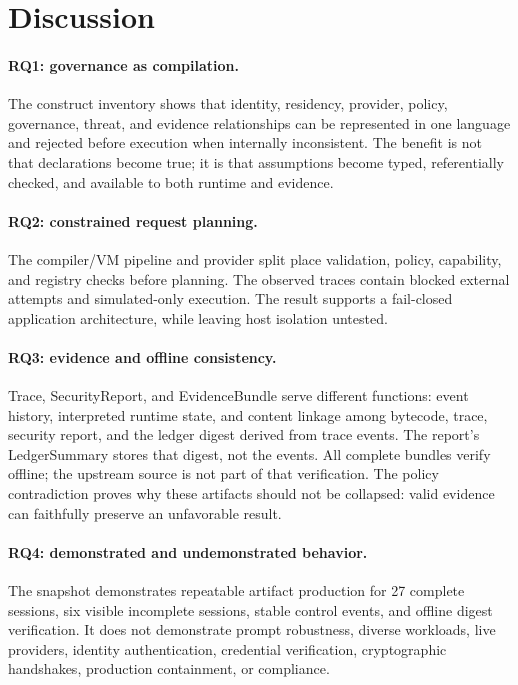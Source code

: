 \section{Discussion}\label{sec:discussion}

\paragraph{RQ1: governance as compilation.}
The construct inventory shows that identity, residency, provider, policy,
governance, threat, and evidence relationships can be represented in one
language and rejected before execution when internally inconsistent.  The
benefit is not that declarations become true; it is that assumptions become
typed, referentially checked, and available to both runtime and evidence.

\paragraph{RQ2: constrained request planning.}
The compiler/VM pipeline and provider split place validation, policy,
capability, and registry checks before planning.  The observed traces contain
blocked external attempts and simulated-only execution.  The result supports a
fail-closed application architecture, while leaving host isolation untested.

\paragraph{RQ3: evidence and offline consistency.}
Trace, SecurityReport, and EvidenceBundle serve different functions: event
history, interpreted runtime state, and content linkage among bytecode, trace,
security report, and the ledger digest derived from trace events.  The report's
LedgerSummary stores that digest, not the events.  All complete bundles verify offline;
the upstream source is not part of that verification.  The policy contradiction proves why these artifacts should
not be collapsed: valid evidence can faithfully preserve an unfavorable
result.

\paragraph{RQ4: demonstrated and undemonstrated behavior.}
The snapshot demonstrates repeatable artifact production for 27 complete
sessions, six visible incomplete sessions, stable control events, and offline
digest verification.  It does not demonstrate prompt robustness, diverse
workloads, live providers, identity authentication, credential verification,
cryptographic handshakes, production containment, or compliance.

